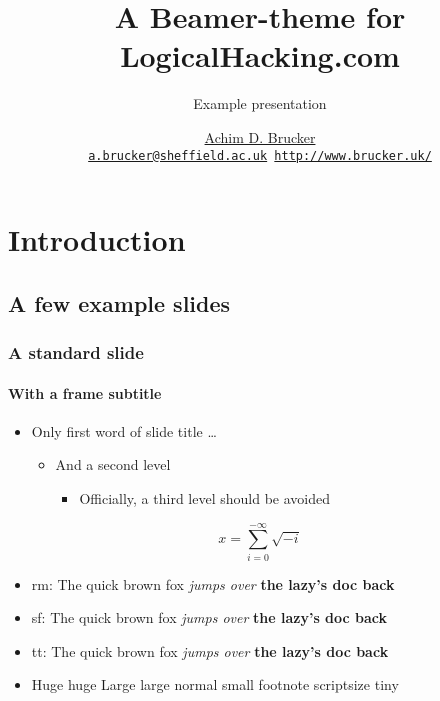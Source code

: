 \documentclass[inverse,aspectratio=169,classification=public-cc-by]{lh-presentation}
\title{A Beamer-theme for LogicalHacking.com}
\subtitle{Example presentation}
\institute[The University of Sheffield]
{Department of Computer Science, The University of Sheffield, Sheffield, UK}
\author[A.D. Brucker] {%
    \href{http://www.brucker.uk/}{Achim D. Brucker}\\
    \texttt{\footnotesize\href{mailto:"Achim D. Brucker"
        <a.brucker@sheffield.ac.uk>}{a.brucker@sheffield.ac.uk}
      \hspace{.6cm}
      \url{http://www.brucker.uk/}}
    }
\begin{document}
\begin{frame}[plain]
  \maketitle
\end{frame}

\AgendaFrame

\section{Introduction}
\subsection{A few example slides}
\frame{\sectionpage}
\begin{frame}[classification={confidential}]
  \frametitle{A standard slide}
  \framesubtitle{With a frame subtitle}
  \begin{itemize}
  \item Only first word of slide title \ldots
    \begin{itemize}
    \item  And a second level 
      \begin{itemize}
      \item  Officially, a third level should be avoided
      \end{itemize}
    \end{itemize}
  \end{itemize}
  \[ x = \sum_{i=0}^{-\infty}\sqrt{-i}\]
\begin{itemize}
\item rm: {\rmfamily The quick {\mdseries brown fox} \emph{jumps over} \textbf{the lazy's doc back}}
\item sf: {\sffamily The quick {\mdseries brown fox} \emph{jumps over} \textbf{the lazy's doc back}}
\item tt: {\ttfamily The quick {\mdseries brown fox} \emph{jumps over} \textbf{the lazy's doc back}}
\item {\Huge Huge} {\huge huge} {\Large Large} {\large large} {\normalsize normal} {\small small} 
      {\footnotesize footnote} {\scriptsize scriptsize} {\tiny tiny}
\end{itemize}
\end{frame}
\end{document}
